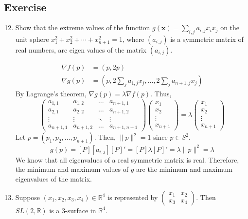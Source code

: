 \subsection*{Exercise}
\begin{enumerate}
	\setcounter{enumi}{11}
	\item Show that the extreme values of the function $g(\boldsymbol{x}) = \sum_{i,j} a_{i,j} x_i x_j$ on the unit sphere $x_1^2 + x_2^2 + \dotsb + x_{n+1}^2 = 1$, where $(a_{i,j})$ is a symmetric matrix of real numbers, are eigen values of the matrix $(a_{i,j})$.
	\begin{important}
		\begin{align*}
			\nabla f(p) & = (p,2p) \\
			\nabla g(p) & = (p,2\sum_j a_{1,j}x_j,\dots,2\sum_j a_{n+1,j} x_j) 
		\end{align*}
		By Lagrange's theorem, $\nabla g(p) = \lambda \nabla f(p)$. Thus,
		$$ \begin{pmatrix} a_{1,1} & a_{1,2} & \dots & a_{n+1,1} \\ a_{2,1} & a_{2,2} & \dots & a_{n+1,2} \\ \vdots & \vdots & \ddots & \vdots \\ a_{n+1,1} & a_{n+1,2} & \dots & a_{n+1,n+1} \end{pmatrix} \begin{pmatrix} x_1 \\ x_2 \\ \vdots \\ x_{n+1} \end{pmatrix} = \lambda \begin{pmatrix} x_1 \\ x_2 \\ \vdots \\ x_{n+1} \end{pmatrix}  $$
	Let $p = (p_1,p_2,\dots,p_{n+1})$. Then, $\|p\|^2 = 1$ since $p \in S^2$.
	$$ g(p) = [P][a_{i,j}][P]' = [P]\lambda[P]' = \lambda \|p\|^2 = \lambda $$
	We know that all eigenvalues of a real symmetric matrix is real. 
	Therefore, the minimum and maximum values of $g$ are the minimum and maximum eigenvalues of the matrix.
	\end{important}
	\setcounter{enumi}{14}
	\item Suppose $(x_1,x_2,x_3,x_4) \in \mathbb{R}^4$ is represented by $\begin{pmatrix} x_1 & x_2 \\ x_3 & x_4 \end{pmatrix}$. Then $SL(2,\mathbb{R})$ is a $3$-surface in $\mathbb{R}^4$.\\


\end{enumerate}

